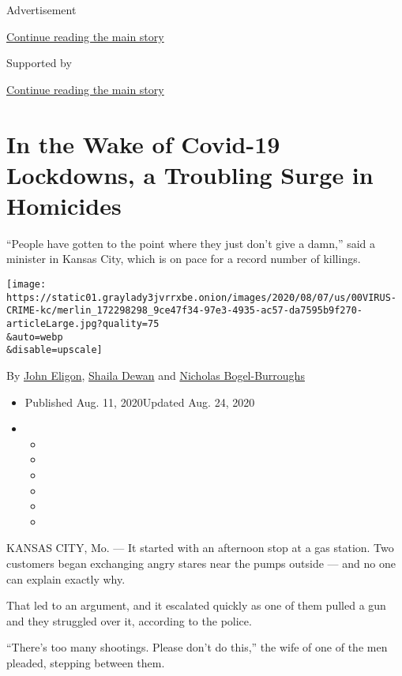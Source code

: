 Advertisement

\protect\hyperlink{after-top}{Continue reading the main story}

Supported by

\protect\hyperlink{after-sponsor}{Continue reading the main story}

\hypertarget{in-the-wake-of-covid-19-lockdowns-a-troubling-surge-in-homicides}{%
\section{In the Wake of Covid-19 Lockdowns, a Troubling Surge in
Homicides}\label{in-the-wake-of-covid-19-lockdowns-a-troubling-surge-in-homicides}}

``People have gotten to the point where they just don't give a damn,''
said a minister in Kansas City, which is on pace for a record number of
killings.

\texttt{[image: https://static01.graylady3jvrrxbe.onion/images/2020/08/07/us/00VIRUS-CRIME-kc/merlin\_172298298\_9ce47f34-97e3-4935-ac57-da7595b9f270-articleLarge.jpg?quality=75\\\&auto=webp\\\&disable=upscale]}

By \href{https://www.nytimes3xbfgragh.onion/by/john-eligon}{John
Eligon},
\href{https://www.nytimes3xbfgragh.onion/by/shaila-dewan}{Shaila Dewan}
and
\href{https://www.nytimes3xbfgragh.onion/by/nicholas-bogel-burroughs}{Nicholas
Bogel-Burroughs}

\begin{itemize}
\item
  Published Aug. 11, 2020Updated Aug. 24, 2020
\item
  \begin{itemize}
  \item
  \item
  \item
  \item
  \item
  \item
  \end{itemize}
\end{itemize}

KANSAS CITY, Mo. --- It started with an afternoon stop at a gas station.
Two customers began exchanging angry stares near the pumps outside ---
and no one can explain exactly why.

That led to an argument, and it escalated quickly as one of them pulled
a gun and they struggled over it, according to the police.

``There's too many shootings. Please don't do this,'' the wife of one of
the men pleaded, stepping between them.

